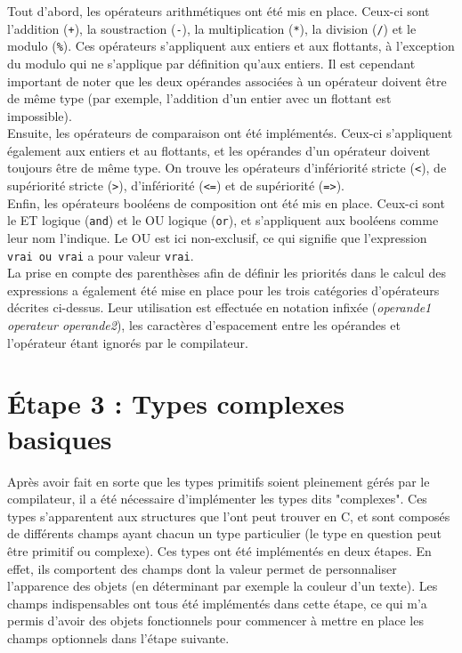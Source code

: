 \documentclass[a4paper, 12pt]{report}
\begin{document}
	Tout d'abord, les opérateurs arithmétiques ont été mis en place. Ceux-ci sont l'addition (\texttt{+}), la soustraction (\texttt{-}), la multiplication (\texttt{*}), la division (\texttt{/}) et le modulo (\texttt{\%}). Ces opérateurs s'appliquent aux entiers et aux flottants, à l'exception du modulo qui ne s'applique par définition qu'aux entiers. Il est cependant important de noter que les deux opérandes associées à un opérateur doivent être de même type (par exemple, l'addition d'un entier avec un flottant est impossible).\\

	Ensuite, les opérateurs de comparaison ont été  implémentés. Ceux-ci s'appliquent également aux entiers et au flottants, et les opérandes d'un opérateur doivent toujours être de même type. On trouve les opérateurs d'infériorité stricte (\texttt{<}), de supériorité stricte (\texttt{>}), d'infériorité (\texttt{<=}) et de supériorité (\texttt{=>}).\\
	
	Enfin, les opérateurs booléens de composition ont été mis en place. Ceux-ci sont le ET logique (\texttt{and}) et le OU logique (\texttt{or}), et s'appliquent aux booléens comme leur nom l'indique. Le OU est ici non-exclusif, ce qui signifie que l'expression \texttt{vrai ou vrai} a pour valeur \texttt{vrai}.\\
	
	La prise en compte des parenthèses afin de définir les priorités dans le calcul des expressions a également été mise en place pour les trois catégories d'opérateurs décrites ci-dessus. Leur utilisation est effectuée en notation infixée (\textit{operande1 operateur operande2}), les caractères d'espacement entre les opérandes et l'opérateur étant ignorés par le compilateur.
    
\chapter{\'Etape 3 : Types complexes basiques}

	Après avoir fait en sorte que les types primitifs soient pleinement gérés par le compilateur, il a été nécessaire d'implémenter les types dits "complexes". Ces types s'apparentent aux structures que l'ont peut trouver en C, et sont composés de différents champs ayant chacun un type particulier (le type en question peut être primitif ou complexe). Ces types ont été implémentés en deux étapes. En effet, ils comportent des champs dont la valeur permet de personnaliser l'apparence des objets (en déterminant par exemple la couleur d'un texte). Les champs indispensables ont tous été implémentés dans cette étape, ce qui m'a permis d'avoir des objets fonctionnels pour commencer à mettre en place les champs optionnels dans l'étape suivante.\\
	
\end{document}
